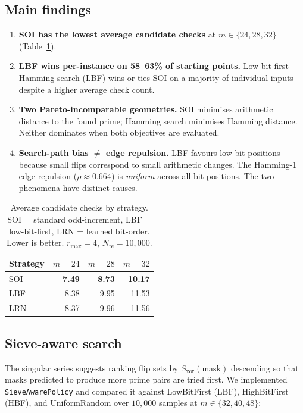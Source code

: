 \documentclass[12pt]{article}
\begin{document}
\subsection{Main findings}

\begin{enumerate}[label=(\roman*)]
  \item \textbf{SOI has the lowest average candidate checks}
    at $m \in \{24,28,32\}$ (Table~\ref{tab:checks}).

  \item \textbf{LBF wins per-instance on 58--63\% of starting points.}
    Low-bit-first Hamming search (LBF) wins or ties SOI on a majority of
    individual inputs despite a higher average check count.

  \item \textbf{Two Pareto-incomparable geometries.}
    SOI minimises arithmetic distance to the found prime;
    Hamming search minimises Hamming distance.
    Neither dominates when both objectives are evaluated.

  \item \textbf{Search-path bias $\neq$ edge repulsion.}
    LBF favours low bit positions because small flips correspond to small
    arithmetic changes.  The Hamming-1 edge repulsion ($\rho \approx 0.664$)
    is \emph{uniform} across all bit positions.
    The two phenomena have distinct causes.
\end{enumerate}

\begin{table}[h]
\centering
\caption{Average candidate checks by strategy.
SOI = standard odd-increment, LBF = low-bit-first, LRN = learned bit-order.
Lower is better.  $r_{\max}=4$, $N_{\mathrm{te}}=10{,}000$.}
\label{tab:checks}
\begin{tabular}{lrrr}
\toprule
Strategy & $m=24$ & $m=28$ & $m=32$ \\
\midrule
SOI  & \textbf{7.49} & \textbf{8.73} & \textbf{10.17} \\
LBF  & 8.38 & 9.95 & 11.53 \\
LRN  & 8.37 & 9.96 & 11.56 \\
\bottomrule
\end{tabular}
\end{table}

\subsection{Sieve-aware search}

The singular series suggests ranking flip sets by $S_{\mathrm{xor}}(\mathrm{mask})$
descending so that masks predicted to produce more prime pairs are tried first.
We implemented \texttt{SieveAwarePolicy} and compared it against
LowBitFirst (LBF), HighBitFirst (HBF), and UniformRandom
over $10{,}000$ samples at $m \in \{32, 40, 48\}$:
\end{document}
